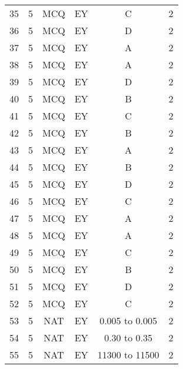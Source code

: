 \begin{table}[htbp]
\begin{tabular}{|c|c|c|c|c|c|}
35 & 5 & MCQ & EY & C & 2 \\
36 & 5 & MCQ & EY & D & 2 \\
37 & 5 & MCQ & EY & A & 2 \\
38 & 5 & MCQ & EY & A & 2 \\
39 & 5 & MCQ & EY & D & 2 \\
40 & 5 & MCQ & EY & B & 2 \\
41 & 5 & MCQ & EY & C & 2 \\
42 & 5 & MCQ & EY & B & 2 \\
43 & 5 & MCQ & EY & A & 2 \\
44 & 5 & MCQ & EY & B & 2 \\
45 & 5 & MCQ & EY & D & 2 \\
46 & 5 & MCQ & EY & C & 2 \\
47 & 5 & MCQ & EY & A & 2 \\
48 & 5 & MCQ & EY & A & 2 \\
49 & 5 & MCQ & EY & C & 2 \\
50 & 5 & MCQ & EY & B & 2 \\
51 & 5 & MCQ & EY & D & 2 \\
52 & 5 & MCQ & EY & C & 2 \\
53 & 5 & NAT & EY & 0.005 to 0.005 & 2 \\
54 & 5 & NAT & EY & 0.30 to 0.35 & 2 \\
55 & 5 & NAT & EY & 11300 to 11500 & 2 \\
\hline
\end{tabular}
\end{table}
